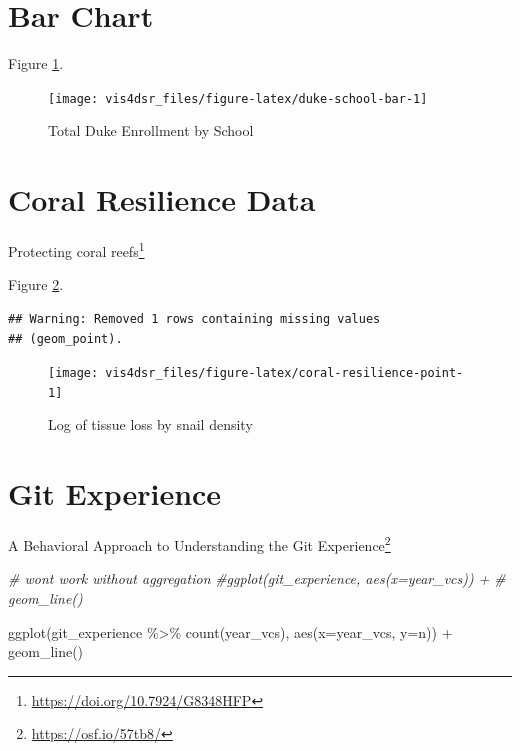 \documentclass[
]{krantz}
\makeatletter
\newenvironment{Shaded}{\begin{snugshade}}{\end{snugshade}}
\newcommand{\AttributeTok}[1]{\textcolor[rgb]{0.61,0.61,0.61}{#1}}
\newcommand{\CommentTok}[1]{\textcolor[rgb]{0.37,0.37,0.37}{\textit{#1}}}
\newcommand{\FunctionTok}[1]{\textcolor[rgb]{0,0,0}{#1}}
\newcommand{\NormalTok}[1]{#1}
\newcommand{\SpecialCharTok}[1]{\textcolor[rgb]{0,0,0}{#1}}
\renewcommand{\href}[2]{#2\footnote{\url{#1}}}
\newenvironment{kframe}{%
\medskip{}
\setlength{\fboxsep}{.8em}
 \def\at@end@of@kframe{}%
 \ifinner\ifhmode%
  \def\at@end@of@kframe{\end{minipage}}%
  \begin{minipage}{\columnwidth}%
 \fi\fi%
 \def\FrameCommand##1{\hskip\@totalleftmargin \hskip-\fboxsep
 \colorbox{shadecolor}{##1}\hskip-\fboxsep
     \hskip-\linewidth \hskip-\@totalleftmargin \hskip\columnwidth}%
 \MakeFramed {\advance\hsize-\width
   \@totalleftmargin\z@ \linewidth\hsize
   \@setminipage}}%
 {\par\unskip\endMakeFramed%
 \at@end@of@kframe}
\renewenvironment{Shaded}{\begin{kframe}}{\end{kframe}}
\makeatother
\begin{document}
\hypertarget{bar-chart-1}{%
\section{Bar Chart}\label{bar-chart-1}}

Figure \ref{fig:duke-school-bar}.

\begin{figure}
\texttt{[image: vis4dsr\_files/figure-latex/duke-school-bar-1]} \caption{Total Duke Enrollment by School}\label{fig:duke-school-bar}
\end{figure}

\hypertarget{coral-resilience-data}{%
\section*{Coral Resilience Data}\label{coral-resilience-data}}


\href{https://doi.org/10.7924/G8348HFP}{Protecting coral reefs}

Figure \ref{fig:coral-resilience-point}.

\begin{verbatim}
## Warning: Removed 1 rows containing missing values
## (geom_point).
\end{verbatim}

\begin{figure}
\texttt{[image: vis4dsr\_files/figure-latex/coral-resilience-point-1]} \caption{Log of tissue loss by snail density}\label{fig:coral-resilience-point}
\end{figure}

\hypertarget{git-experience}{%
\section*{Git Experience}\label{git-experience}}


\href{https://osf.io/57tb8/}{A Behavioral Approach to Understanding the Git Experience}

\begin{Shaded}
\begin{Highlighting}[]
\CommentTok{\# won\textquotesingle{}t work without aggregation}
\CommentTok{\#ggplot(git\_experience, aes(x=year\_vcs)) +}
\CommentTok{\#  geom\_line()}

\FunctionTok{ggplot}\NormalTok{(git\_experience }\SpecialCharTok{\%\textgreater{}\%} \FunctionTok{count}\NormalTok{(year\_vcs), }\FunctionTok{aes}\NormalTok{(}\AttributeTok{x=}\NormalTok{year\_vcs, }\AttributeTok{y=}\NormalTok{n)) }\SpecialCharTok{+}
  \FunctionTok{geom\_line}\NormalTok{()}
\end{Highlighting}
\end{Shaded}
\end{document}
